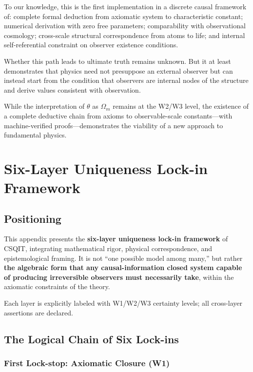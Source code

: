 \documentclass[aps,prd,twocolumn,nofootinbib,floatfix]{revtex4-2}
\begin{document}
To our knowledge, this is the first implementation in a discrete causal framework of: complete formal deduction from axiomatic system to characteristic constant; numerical derivation with zero free parameters; comparability with observational cosmology; cross-scale structural correspondence from atoms to life; and internal self-referential constraint on observer existence conditions.

Whether this path leads to ultimate truth remains unknown. But it at least demonstrates that physics need not presuppose an external observer but can instead start from the condition that observers are internal nodes of the structure and derive values consistent with observation.

While the interpretation of $\theta$ as $\Omega_m$ remains at the W2/W3 level, the existence of a complete deductive chain from axioms to observable-scale constants---with machine-verified proofs---demonstrates the viability of a new approach to fundamental physics.

\appendix

\section{Six-Layer Uniqueness Lock-in Framework}

\subsection{Positioning}

This appendix presents the \textbf{six-layer uniqueness lock-in framework} of CSQIT, integrating mathematical rigor, physical correspondence, and epistemological framing. It is not ``one possible model among many,'' but rather \textbf{the algebraic form that any causal-information closed system capable of producing irreversible observers must necessarily take}, within the axiomatic constraints of the theory.

Each layer is explicitly labeled with W1/W2/W3 certainty levels; all cross-layer assertions are declared.

\subsection{The Logical Chain of Six Lock-ins}

\subsubsection*{First Lock-stop: Axiomatic Closure (W1)}
\end{document}
